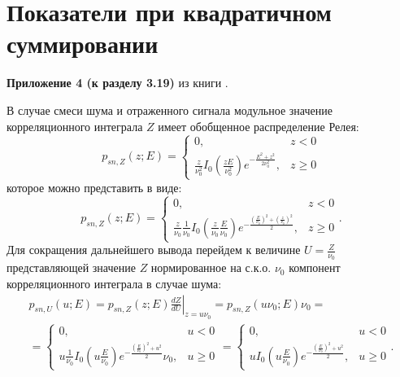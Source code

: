 \documentclass[a4paper,12pt]{article}
\newcommand{\fda}[2]{ \frac{d #1}{d #2}}
\begin{document}
    \section{Показатели при квадратичном суммировании}

    \textbf{Приложение 4 (к разделу 3.19)} из книги \cite{SCHIRMAN}.

    В случае смеси шума и отраженного сигнала модульное значение корреляционного интеграла $Z$ имеет обобщенное распределение Релея:
    \[
        p_{sn,Z}(z ; E)
        = \left \{
        \begin{array}{ll}
            0,                                                                                             & z < 0   \\
            \frac{z}{\nu_0^2} I_0 \left ( \frac{z E}{\nu_0^2} \right ) e^{- \frac{E^2 + z^2}{2 \nu_0^2}} , & z \ge 0
        \end{array}
        \right .
    \]
    которое можно представить в виде:
    \[
        p_{sn,Z}(z ; E)
        = \left \{
        \begin{array}{ll}
            0,                                                                                                                                                                            & z < 0   \\
            \frac{z}{\nu_0} \frac{1}{\nu_0} I_0 \left ( \frac{z}{\nu_0} \frac{E}{\nu_0} \right ) e^{- \frac{\left ( \frac{E}{\nu_0} \right )^2 + \left ( \frac{z}{\nu_0} \right)^2}{2}} , & z \ge 0
        \end{array}
        \right .
        .
    \]
    Для сокращения дальнейшего вывода перейдем к величине $U = \frac{Z}{\nu_0}$ представляющей значение $Z$ нормированное на с.к.о. $\nu_0$ компонент корреляционного интеграла в случае шума:
    \begin{multline*}
        p_{sn,U}(u ; E)
        = \left . p_{sn,Z}(z; E) \fda{Z}{U} \right |_{z = u \nu_0}
        = p_{sn,Z}(u \nu_0; E) \nu_0 = \\
        = \left \{
        \begin{array}{ll}
            0,                                                                                                                        & u < 0   \\
            u \frac{1}{\nu_0} I_0 \left ( u \frac{E}{\nu_0} \right ) e^{- \frac{\left ( \frac{E}{\nu_0} \right )^2 + u^2}{2}} \nu_0 , & u \ge 0
        \end{array}
        \right .
        = \left \{
        \begin{array}{ll}
            0,                                                                                                  & u < 0   \\
            u I_0 \left ( u \frac{E}{\nu_0} \right ) e^{- \frac{\left ( \frac{E}{\nu_0} \right )^2 + u^2}{2}} , & u \ge 0
        \end{array}
        \right .
        .
    \end{multline*}
\end{document}
